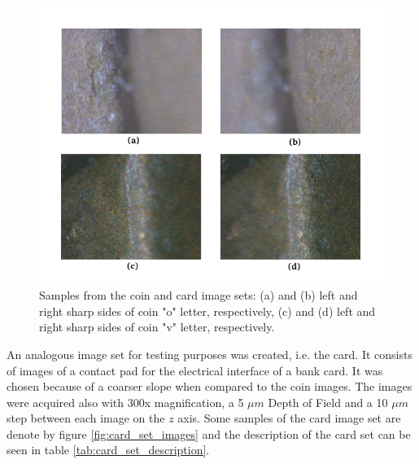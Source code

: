 \begin{figure}[H]
	\centering
	\caption{\label{fig:card_coin_images}Samples from the coin and card image sets: (a) and (b) left and right sharp sides of coin "o" letter, respectively, (c) and (d) left and right sharp sides of coin "v" letter, respectively.}
	\begin{center}
	    \includegraphics[scale=0.6, trim = {0 1cm 0 1cm}]{images/fig17.png}
	\end{center}
	\centering
    \fautor
\end{figure}

\noindent An analogous image set for testing purposes was created, i.e. the card. It consists of images of a contact pad for the electrical interface of a bank card. It was chosen because of a coarser slope when compared to the coin images. The images were acquired also with 300x magnification, a 5 $\mu m$ Depth of Field and a 10 $\mu m$ step between each image on the $z$ axis. Some samples of the card image set are denote by figure \ref{fig:card_set_images} and the description of the card set can be seen in table \ref{tab:card_set_description}.

